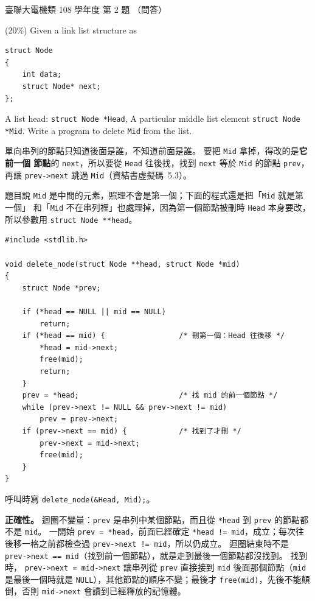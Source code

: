 \begin{pastexam}[label={px:ust-108-ee-ds-02}]{臺聯大電機類 108 學年度 第 2 題}
（問答）

(20\%) Given a link list structure as
\begin{verbatim}
struct Node
{
    int data;
    struct Node* next;
};
\end{verbatim}
A list head: \texttt{struct Node *Head}, A particular middle list element \texttt{struct Node *Mid}.
Write a program to delete \texttt{Mid} from the list.
\end{pastexam}

\begin{pastsoln}
單向串列的節點只知道後面是誰，不知道前面是誰。 要把 \texttt{Mid} 拿掉，得改的是\textbf{它前一個
節點}的 \texttt{next}，所以要從 \texttt{Head} 往後找，找到 \texttt{next} 等於 \texttt{Mid} 的節點
\texttt{prev}，再讓 \texttt{prev->next} 跳過 \texttt{Mid}（資結書虛擬碼~5.3）。

題目說 \texttt{Mid} 是中間的元素，照理不會是第一個；下面的程式還是把「\texttt{Mid} 就是第一個」
和「\texttt{Mid} 不在串列裡」也處理掉，因為第一個節點被刪時 \texttt{Head} 本身要改，所以參數用
\texttt{struct Node **head}。

\begin{verbatim}
#include <stdlib.h>

void delete_node(struct Node **head, struct Node *mid)
{
    struct Node *prev;

    if (*head == NULL || mid == NULL)
        return;
    if (*head == mid) {                 /* 刪第一個：Head 往後移 */
        *head = mid->next;
        free(mid);
        return;
    }
    prev = *head;                       /* 找 mid 的前一個節點 */
    while (prev->next != NULL && prev->next != mid)
        prev = prev->next;
    if (prev->next == mid) {            /* 找到了才刪 */
        prev->next = mid->next;
        free(mid);
    }
}
\end{verbatim}
呼叫時寫 \texttt{delete\_node(\&Head, Mid);}。

\textbf{正確性。} 迴圈不變量：\texttt{prev} 是串列中某個節點，而且從 \texttt{*head} 到
\texttt{prev} 的節點都不是 \texttt{mid}。 一開始 \texttt{prev = *head}，前面已經確定
\texttt{*head != mid}，成立；每次往後移一格之前都檢查過 \texttt{prev->next != mid}，所以仍成立。
迴圈結束時不是 \texttt{prev->next == mid}（找到前一個節點），就是走到最後一個節點都沒找到。 找到時，
\texttt{prev->next = mid->next} 讓串列從 \texttt{prev} 直接接到 \texttt{mid} 後面那個節點（\texttt{mid}
是最後一個時就是 \texttt{NULL}），其他節點的順序不變；最後才 \texttt{free(mid)}，先後不能顛倒，否則
\texttt{mid->next} 會讀到已經釋放的記憶體。


\end{pastsoln}

